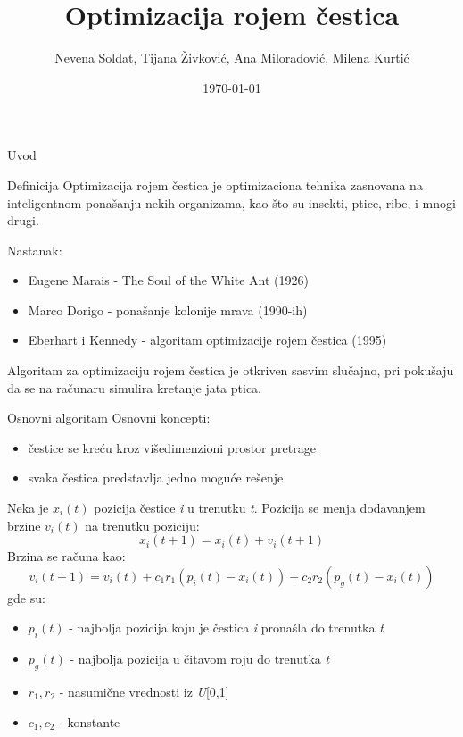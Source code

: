 \documentclass{beamer}
\title[Optimizacija rojem čestica]{\textbf{Optimizacija rojem čestica}}
\author{Nevena Soldat, Tijana Živković, Ana Miloradović, Milena Kurtić}
\institute{Matematički fakultet, Univerzitet u Beogradu}
\date{\today}
\begin{document}
{
\frame{\titlepage}
}


\begin{frame}{Uvod}

\begin{block}{Definicija}
Optimizacija rojem čestica je \alert{optimizaciona tehnika} zasnovana na inteligentnom ponašanju nekih organizama, kao što su insekti, ptice, ribe, i mnogi drugi.
\end{block}

Nastanak:
\begin{itemize}
    \item Eugene Marais - The Soul of the White Ant (1926)
    \item Marco Dorigo - ponašanje kolonije mrava (1990-ih) 
    \item Eberhart i Kennedy - algoritam optimizacije rojem čestica (1995)
\end{itemize}

Algoritam za optimizaciju rojem čestica je otkriven sasvim slučajno, pri pokušaju da se na računaru simulira kretanje jata ptica.
\end{frame}

\begin{frame}{Osnovni algoritam}
Osnovni koncepti:
\begin{itemize}
    \item čestice se kreću kroz višedimenzioni prostor pretrage
    \item svaka čestica predstavlja jedno moguće rešenje
\end{itemize}

Neka je $x_i(t)$ pozicija čestice \textit{i} u trenutku \textit{t}. Pozicija se menja dodavanjem brzine $v_i(t)$ na trenutku poziciju:
\[x_i(t+1) = x_i(t) + v_i(t+1) \]
Brzina se računa kao:
\[ v_i(t+1) = v_i(t) + c_1r_1(p_i(t) - x_i(t)) + c_2r_2(p_g(t) - x_i(t))\] gde su:

\begin{itemize}
    \item $p_i(t)$ - najbolja pozicija koju je čestica \textit{i} pronašla do trenutka \textit{t}
    \item $p_g(t)$ - najbolja pozicija u čitavom roju do trenutka \textit{t}
    \item $r_1, r_2$ - nasumične vrednosti iz \textit{U}[0,1]
    \item $c_1, c_2$ - konstante
\end{itemize}

\end{frame}
\end{document}
